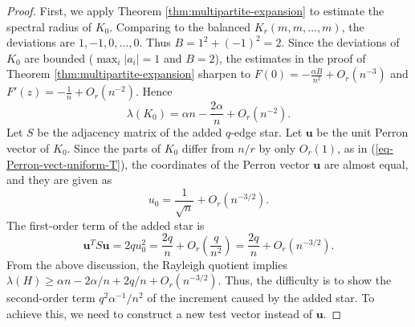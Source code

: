\documentclass[11pt,a4paper]{article}
\theoremstyle{definition}
\theoremstyle{plain}
\renewcommand{\ge}{\geqslant}
\begin{document}
\begin{proof} 
First, we apply Theorem \ref{thm:multipartite-expansion} to estimate the spectral radius of $K_0$.  
Comparing to the balanced $K_r(m,m,\ldots,m)$, the deviations are
$ 1,-1,0,\ldots,0$. 
Thus $  B=1^2+(-1)^2=2$.  
Since the deviations of $K_0$ are bounded ($\max_i|a_i|=1$ and $B=2$), the
estimates in the proof of Theorem \ref{thm:multipartite-expansion} sharpen to
$F(0)=-\tfrac{\alpha B}{n^2}+O_r(n^{-3})$ and $F'(z)=-\tfrac1n+O_r(n^{-2})$. 
Hence
\begin{equation*}
        \lambda(K_0)=\alpha n-\frac{2\alpha}{n}+O_r(n^{-2}).
\end{equation*}  
Let $S$ be the adjacency matrix of the added $q$-edge star.  Let $\bm{u}$ be the unit
Perron vector of $K_0$. Since the parts of $K_0$ differ from $n/r$ by only $O_r(1)$, as in (\ref{eq-Perron-vect-uniform-T}), the coordinates of the Perron vector $\bm{u}$ are almost equal, and they are given as  
\begin{equation}
        u_0 =\frac1{\sqrt n}+O_r(n^{-3/2}).
        \label{eq:u0-star}
\end{equation}
The first-order term of the added star is
\begin{equation}
        \bm{u}^TS\bm{u}=2q u_0^2=\frac{2q}{n}+O_r\left(\frac q{n^2}\right)
              =\frac{2q}{n}+O_r(n^{-3/2}).
        \label{eq:uSu-star}
\end{equation} 
From the above discussion, the Rayleigh quotient implies 
$\lambda (H)\ge  \alpha n - {2\alpha}/{n} + 2q/n + O_r(n^{-3/2})$. 
Thus, the difficulty is to show the second-order term $q^2\alpha^{-1}/n^2$ of the increment caused by the added star.  
To achieve this, we need to construct a new test vector instead of $\bm{u}$.



\end{proof}
\end{document}
